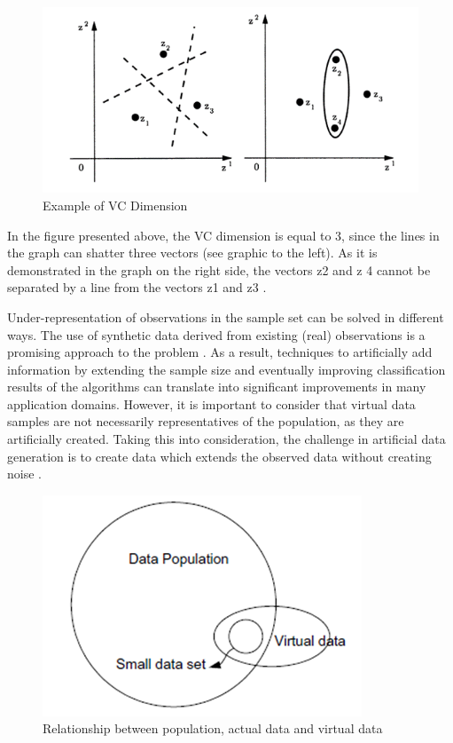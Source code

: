 \documentclass[parskip=full]{scrartcl}
\begin{document}
\begin{figure}[H]
	\centering
	\includegraphics[width=0.6\linewidth]{"./resources/vc_dimension"}
	\caption{Example of VC Dimension \cite{Vapnik.2008}}
	\label{fig:vc-dimension}
\end{figure}

In the figure presented above, the VC dimension is equal to 3, since the lines
in the graph can shatter three vectors (see graphic to the left). As it is
demonstrated in the graph on the right side, the vectors z{\tiny 2} and z{\tiny
4} cannot be separated by a line from the vectors z{\tiny 1} and z{\tiny 3}
\cite{Vapnik.2008}.

Under-representation of observations in the sample set can be solved in 
different ways. The use of synthetic data derived from existing (real) 
observations is a promising approach to the problem \cite{Sezer.2014}. As a 
result, techniques to artificially add information by extending the sample size 
and eventually improving classification results of the algorithms can translate 
into significant improvements in many application domains. However, it is 
important to consider that virtual data samples are not necessarily 
representatives of the population, as they are artificially created. Taking 
this into consideration, the challenge in artificial data generation is to 
create data which extends the observed data without creating noise 
\cite{Li.2006}. 

\begin{figure}[H]
	\centering
	\includegraphics[width=0.35\linewidth]{./Resources/relationship}
	\caption{Relationship between population, actual data and virtual data \cite{Li.2006}}
	\label{fig:relationship}
\end{figure}
\end{document}
